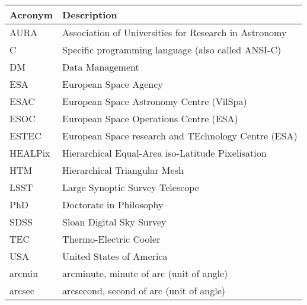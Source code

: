\addtocounter{table}{-1}
\begin{longtable}{|l|p{}|}\hline
\textbf{Acronym} & \textbf{Description}  \\\hline

AURA&Association of Universities for Research in Astronomy \\\hline
C&Specific programming language (also called ANSI-C) \\\hline
DM&Data Management \\\hline
ESA&European Space Agency \\\hline
ESAC&European Space Astronomy Centre (VilSpa) \\\hline
ESOC&European Space Operations Centre (ESA) \\\hline
ESTEC&European Space research and TEchnology Centre (ESA) \\\hline
HEALPix&Hierarchical Equal-Area iso-Latitude Pixelisation \\\hline
HTM&Hierarchical Triangular Mesh \\\hline
LSST&Large Synoptic Survey Telescope \\\hline
PhD&Doctorate in Philosophy \\\hline
SDSS&Sloan Digital Sky Survey \\\hline
TEC&Thermo-Electric Cooler \\\hline
USA&United States of America \\\hline
arcmin&arcminute, minute of arc (unit of angle) \\\hline
arcsec&arcsecond, second of arc (unit of angle) \\\hline
\end{longtable}
